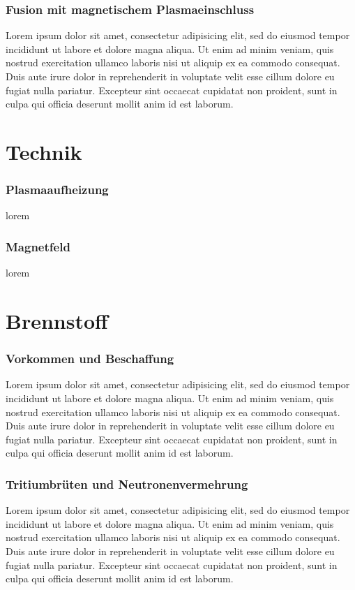 \documentclass[aspectratio=169]{beamer}
\begin{document}
    \begin{frame}
      \frametitle{Fusion mit magnetischem Plasmaeinschluss}
      Lorem ipsum dolor sit amet, consectetur adipisicing elit, sed do eiusmod tempor incididunt ut labore et dolore magna aliqua. Ut enim ad minim veniam, quis nostrud exercitation ullamco laboris nisi ut aliquip ex ea commodo consequat. Duis aute irure dolor in reprehenderit in voluptate velit esse cillum dolore eu fugiat nulla pariatur. Excepteur sint occaecat cupidatat non proident, sunt in culpa qui officia deserunt mollit anim id est laborum.
    \end{frame}

  \section{Technik}

    \begin{frame}
      \frametitle{Plasmaaufheizung}
      lorem
    \end{frame}

    \begin{frame}
      \frametitle{Magnetfeld}
      lorem
    \end{frame}

  \section{Brennstoff}

    \begin{frame}
      \frametitle{Vorkommen und Beschaffung}
      Lorem ipsum dolor sit amet, consectetur adipisicing elit, sed do eiusmod tempor incididunt ut labore et dolore magna aliqua. Ut enim ad minim veniam, quis nostrud exercitation ullamco laboris nisi ut aliquip ex ea commodo consequat. Duis aute irure dolor in reprehenderit in voluptate velit esse cillum dolore eu fugiat nulla pariatur. Excepteur sint occaecat cupidatat non proident, sunt in culpa qui officia deserunt mollit anim id est laborum.
    \end{frame}

    \begin{frame}
      \frametitle{Tritiumbrüten und Neutronenvermehrung}
      Lorem ipsum dolor sit amet, consectetur adipisicing elit, sed do eiusmod tempor incididunt ut labore et dolore magna aliqua. Ut enim ad minim veniam, quis nostrud exercitation ullamco laboris nisi ut aliquip ex ea commodo consequat. Duis aute irure dolor in reprehenderit in voluptate velit esse cillum dolore eu fugiat nulla pariatur. Excepteur sint occaecat cupidatat non proident, sunt in culpa qui officia deserunt mollit anim id est laborum.
    \end{frame}
\end{document}
